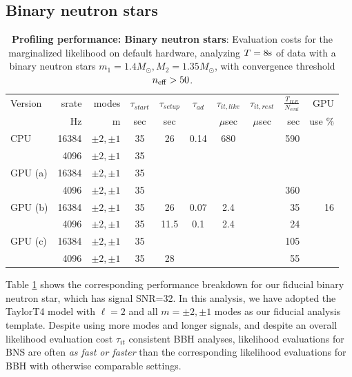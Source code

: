 \documentclass[twocolumn,prd,nofootinbib]{revtex4}
\newcommand\unit[1]{{\rm #1}}
\begin{document}
\subsection{Binary neutron stars}
\begin{table}
\begin{tabular}{lrr|ccccc|rr}
Version & srate & modes & $\tau_{start}$ & $\tau_{setup}$ & $\tau_{ad}$ & $\tau_{it,like}$ &$\tau_{it,rest}$ &
$\frac{T_{ILE}}{N_{eval}}$ & GPU \\  %
  &   Hz & m & sec & sec & & $\mu$sec & $\mu$sec  &sec  & use  \%\\ \hline 
CPU & 16384 & $\pm 2,\pm 1 $ & 35 & 26 & 0.14  & 680  & & 590    \\ 
       & 4096 & $\pm 2, \pm 1$ & 35 & &  &   &&  & \\ \hline
GPU (a) & 16384 & $\pm 2, \pm 1$   & 35 &  &&&&   \\
       & 4096 & $ \pm 2, \pm 1 $        &  35  & &&&& 360 \\ \hline
GPU (b) & 16384 & $\pm 2, \pm 1$   & 35 & 26 & 0.07 &  2.4 & &35 & 16 \\
       & 4096 & $ \pm 2, \pm 1 $        &  35  & 11.5 & 0.1 &  2.4  & &24 &  \\ \hline
GPU (c) & 16384 & $\pm 2, \pm 1$   & 35 &  &&&& 105  \\
       & 4096 & $ \pm 2, \pm 1 $        &  35  & 28 &&&& 55 \\ \hline
\end{tabular}
\caption{\label{tab:CostBreakdown:BNS}\textbf{Profiling performance: Binary neutron stars}: Evaluation costs for the
  marginalized likelihood on default
  hardware,  analyzing $T=8\unit{s}$ of data with a binary neutron stars
  $m_1=1.4 M_\odot,M_2=1.35 M_\odot$, with convergence threshold $n_{\rm eff} > 50$.
}
\end{table}

Table \ref{tab:CostBreakdown:BNS} shows the corresponding performance breakdown for our fiducial binary neutron star,
which has signal SNR=32.  In this analysis, we have adopted the TaylorT4 model with $\ell=2$ and all $m=\pm 2,\pm 1$ modes as our
fiducial analysis template.   Despite using more modes and longer signals, and despite an overall likelihood evaluation
cost $\tau_{it}$ consistent BBH analyses,  likelihood evaluations for BNS are often
\emph{as fast or faster} than the corresponding likelihood evaluations for BBH with otherwise comparable settings.
\end{document}
